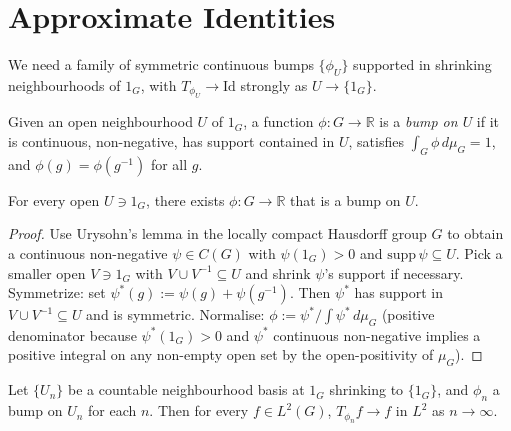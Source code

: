 \chapter{Approximate Identities}
\label{chap:approxId}

We need a family of symmetric continuous bumps $\{\phi_U\}$ supported in
shrinking neighbourhoods of $1_G$, with $T_{\phi_U} \to \mathrm{Id}$
strongly as $U \to \{1_G\}$.

\begin{definition}
  \label{def:bump}
  \leanok
  Given an open neighbourhood $U$ of $1_G$, a function
  $\phi : G \to \mathbb R$ is a \emph{bump on $U$} if it is continuous,
  non-negative, has support contained in $U$, satisfies
  $\int_G \phi\, d\mu_G = 1$, and $\phi(g) = \phi(g^{-1})$ for all $g$.
\end{definition}

\begin{theorem}
  \label{thm:bump-exists}
  For every open $U \ni 1_G$, there exists $\phi : G \to \mathbb R$ that
  is a bump on $U$.
\end{theorem}

\begin{proof}
  Use Urysohn's lemma in the locally compact Hausdorff group $G$ to
  obtain a continuous non-negative $\psi \in C(G)$ with
  $\psi(1_G) > 0$ and $\mathrm{supp}\,\psi \subseteq U$.
  Pick a smaller open $V \ni 1_G$ with $V \cup V^{-1} \subseteq U$
  and shrink $\psi$'s support if necessary.
  Symmetrize: set $\psi^*(g) := \psi(g) + \psi(g^{-1})$.  Then
  $\psi^*$ has support in $V \cup V^{-1} \subseteq U$ and is symmetric.
  Normalise: $\phi := \psi^* / \int \psi^*\,d\mu_G$
  (positive denominator because $\psi^*(1_G) > 0$ and $\psi^*$ continuous
  non-negative implies a positive integral on any non-empty open set
  by the open-positivity of $\mu_G$).
\end{proof}

\begin{theorem}
  \label{thm:bump-conv-tendsto}
  Let $\{U_n\}$ be a countable neighbourhood basis at $1_G$ shrinking to
  $\{1_G\}$, and $\phi_n$ a bump on $U_n$ for each $n$. Then for every
  $f \in L^2(G)$, $T_{\phi_n} f \to f$ in $L^2$ as $n \to \infty$.
\end{theorem}


